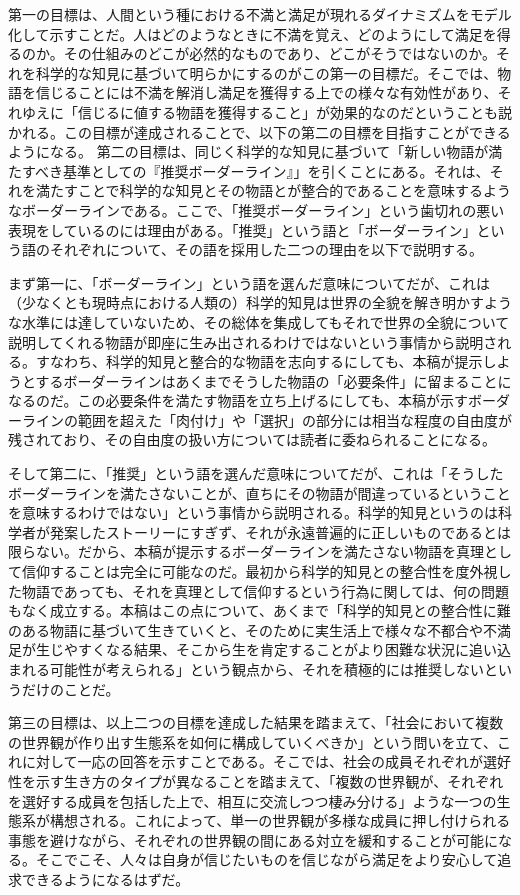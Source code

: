 \documentclass[
]{ltjsarticle}
\begin{document}
第一の目標は、人間という種における不満と満足が現れるダイナミズムをモデル化して示すことだ。人はどのようなときに不満を覚え、どのようにして満足を得るのか。その仕組みのどこが必然的なものであり、どこがそうではないのか。それを科学的な知見に基づいて明らかにするのがこの第一の目標だ。そこでは、物語を信じることには不満を解消し満足を獲得する上での様々な有効性があり、それゆえに「信じるに値する物語を獲得すること」が効果的なのだということも説かれる。この目標が達成されることで、以下の第二の目標を目指すことができるようになる。
第二の目標は、同じく科学的な知見に基づいて「新しい物語が満たすべき基準としての『推奨ボーダーライン』」を引くことにある。それは、それを満たすことで科学的な知見とその物語とが整合的であることを意味するようなボーダーラインである。ここで、「推奨ボーダーライン」という歯切れの悪い表現をしているのには理由がある。「推奨」という語と「ボーダーライン」という語のそれぞれについて、その語を採用した二つの理由を以下で説明する。

まず第一に、「ボーダーライン」という語を選んだ意味についてだが、これは（少なくとも現時点における人類の）科学的知見は世界の全貌を解き明かすような水準には達していないため、その総体を集成してもそれで世界の全貌について説明してくれる物語が即座に生み出されるわけではないという事情から説明される。すなわち、科学的知見と整合的な物語を志向するにしても、本稿が提示しようとするボーダーラインはあくまでそうした物語の「必要条件」に留まることになるのだ。この必要条件を満たす物語を立ち上げるにしても、本稿が示すボーダーラインの範囲を超えた「肉付け」や「選択」の部分には相当な程度の自由度が残されており、その自由度の扱い方については読者に委ねられることになる。

そして第二に、「推奨」という語を選んだ意味についてだが、これは「そうしたボーダーラインを満たさないことが、直ちにその物語が間違っているということを意味するわけではない」という事情から説明される。科学的知見というのは科学者が発案したストーリーにすぎず、それが永遠普遍的に正しいものであるとは限らない。だから、本稿が提示するボーダーラインを満たさない物語を真理として信仰することは完全に可能なのだ。最初から科学的知見との整合性を度外視した物語であっても、それを真理として信仰するという行為に関しては、何の問題もなく成立する。本稿はこの点について、あくまで「科学的知見との整合性に難のある物語に基づいて生きていくと、そのために実生活上で様々な不都合や不満足が生じやすくなる結果、そこから生を肯定することがより困難な状況に追い込まれる可能性が考えられる」という観点から、それを積極的には推奨しないというだけのことだ。

第三の目標は、以上二つの目標を達成した結果を踏まえて、「社会において複数の世界観が作り出す生態系を如何に構成していくべきか」という問いを立て、これに対して一応の回答を示すことである。そこでは、社会の成員それぞれが選好性を示す生き方のタイプが異なることを踏まえて、「複数の世界観が、それぞれを選好する成員を包括した上で、相互に交流しつつ棲み分ける」ような一つの生態系が構想される。これによって、単一の世界観が多様な成員に押し付けられる事態を避けながら、それぞれの世界観の間にある対立を緩和することが可能になる。そこでこそ、人々は自身が信じたいものを信じながら満足をより安心して追求できるようになるはずだ。
\end{document}
